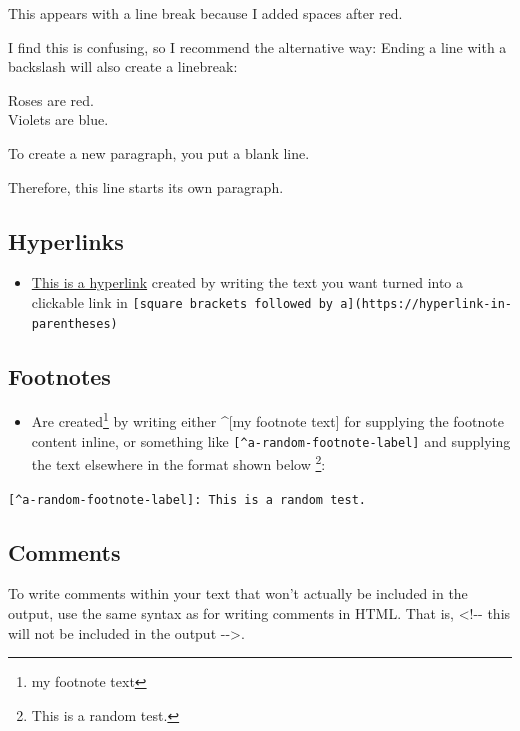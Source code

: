 \documentclass[a4paper, nobind]{templates/ociamthesis}
\providecommand{\tightlist}{%
  \setlength{\itemsep}{0pt}\setlength{\parskip}{0pt}}
\begin{document}
This appears with a line break because I added spaces after red.

I find this is confusing, so I recommend the alternative way: Ending a line with a backslash will also create a linebreak:

Roses are red.\\
Violets are blue.

To create a new paragraph, you put a blank line.

Therefore, this line starts its own paragraph.

\hypertarget{hyperlinks}{%
\subsection{Hyperlinks}\label{hyperlinks}}

\begin{itemize}
\tightlist
\item
  \href{https://www.google.com}{This is a hyperlink} created by writing the text you want turned into a clickable link in \texttt{{[}square\ brackets\ followed\ by\ a{]}(https://hyperlink-in-parentheses)}
\end{itemize}

\hypertarget{footnotes}{%
\subsection{Footnotes}\label{footnotes}}

\begin{itemize}
\tightlist
\item
  Are created\footnote{my footnote text} by writing either \^{}{[}my footnote text{]} for supplying the footnote content inline, or something like \texttt{{[}\^{}a-random-footnote-label{]}} and supplying the text elsewhere in the format shown below \footnote{This is a random test.}:
\end{itemize}

\texttt{{[}\^{}a-random-footnote-label{]}:\ This\ is\ a\ random\ test.}

\hypertarget{comments}{%
\subsection{Comments}\label{comments}}

To write comments within your text that won't actually be included in the output, use the same syntax as for writing comments in HTML. That is, \textless!-\/- this will not be included in the output -\/-\textgreater.
\end{document}
